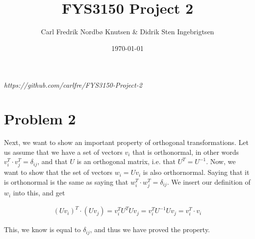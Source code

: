 \documentclass[english,notitlepage]{revtex4-1}  %
\begin{document}
\title{FYS3150 Project 2}      %
\author{Carl Fredrik Nordbø Knutsen \& Didrik Sten Ingebrigtsen}          %
\date{\today}                             %
\noaffiliation                            %


\maketitle 
    
\textit{https://github.com/carlfre/FYS3150-Project-2}
    
\section*{Problem 2}
Next, we want to show an important property of orthogonal transformations. Let us assume that we have a set of vectors $v_i$ that is orthonormal, in other words $v_i^T \cdot v_j^T = \delta_{ij}$, and that $U$ is an orthogonal matrix, i.e. that $U^T = U^{-1}$. Now, we want to show that the set of vectors $w_i = U v_i$ is also orthornormal. Saying that it is orthonormal is the same as saying that $w_i^T \cdot w_j^T = \delta_{ij}$. We insert our definition of $w_i$ into this, and get

\begin{align*}
\left(U v_i \right)^T \cdot (U v_j) = v_i^T U^T U v_j = v_i^T U^{-1} U v_j = v_i^T \cdot v_i
\end{align*}

This, we know is equal to $\delta_{ij}$, and thus we have proved the property.



\end{document}
